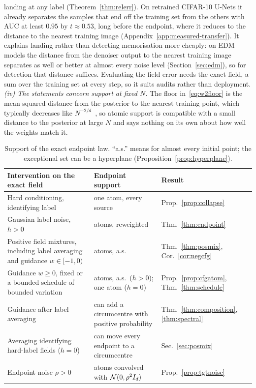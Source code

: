\documentclass{article} %
\newif\ificlr
\theoremstyle{plain}
\theoremstyle{definition}
\theoremstyle{remark}
\begin{document}
landing at any label (Theorem~\ref{thm:relerr}). On retrained CIFAR-10 U-Nets it
already separates the samples that end off the training set from the others with AUC at least
$0.95$ by $t\approx0.53$, long before the endpoint, where it reduces to the distance to the nearest
training image (Appendix~\ref{app:measured-transfer}). It explains landing rather than detecting
memorisation more cheaply: on EDM models the distance from the denoiser output to the nearest
training image separates as well or better at almost every noise level (Section~\ref{sec:edm}),
so for detection that distance suffices. Evaluating the field error needs the exact field, a sum over the training set at every step, so it suits audits
rather than deployment.
\emph{(iv) The statements concern support at fixed $N$.} The floor in~\eqref{eq:w2floor} is the
mean squared distance from the posterior to the nearest training point, which typically decreases
like $N^{-2/d}$~\citep{graf2000quantization}, so atomic support is compatible with a small distance to the posterior at large
$N$ and says nothing on its own about how well the weights match it.

\begin{table}[t]
\centering\footnotesize
\begin{tabular}{@{}p{}p{}p{}@{}}
\toprule
Intervention on the exact field & Endpoint support & Result\\
\midrule
Hard conditioning, identifying label & one atom, every source & Prop.~\ref{prop:collapse}\\
Gaussian label noise, $h>0$ & atoms, reweighted & Thm.~\ref{thm:endpoint}\\
Positive field mixtures, including label averaging and guidance $w\in[-1,0)$ & atoms, a.s. & Thm.~\ref{thm:posmix}, Cor.~\ref{cor:negcfg}\\
Guidance $w\ge0$, fixed or a bounded schedule of bounded variation & atoms, a.s.\ ($h>0$); one atom ($h=0$) & Prop.~\ref{prop:cfgatom}, Thm.~\ref{thm:schedule}\\
Guidance after label averaging & can add a circumcentre with positive probability & Thm.~\ref{thm:composition}, \ref{thm:spectral}\\
Averaging identifying hard-label fields ($h=0$) & can move every endpoint to a circumcentre & Sec.~\ref{sec:posmix}\\
Endpoint noise $\rho>0$ & atoms convolved with $\mathcal{N}(0,\rho^2I_d)$ & Prop.~\ref{prop:tgtnoise}\\
\bottomrule
\end{tabular}
\caption{Support of the exact endpoint law. ``a.s.'' means for almost every initial point; the
exceptional set can be a hyperplane (Proposition~\ref{prop:hyperplane}).\ificlr{} Endpoint noise is the only intervention that leaves the atoms in every configuration, since its endpoint law has a density; averaging hard-label fields leaves them only in configurations such as the symmetric tie of Section~\ref{sec:posmix}.\fi}
\label{tab:interventions}
\end{table}
\end{document}
